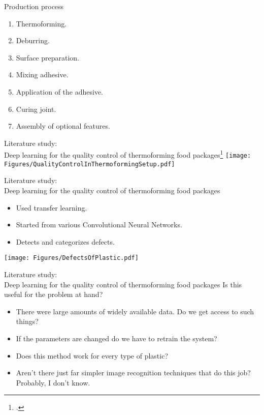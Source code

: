 \documentclass{beamer}
\begin{document}
	\begin{frame}{Production process}
		\begin{enumerate}
			\item Thermoforming.
			\item Deburring.
			\item Surface preparation.
			\item Mixing adhesive.
			\item Application of the adhesive.
			\item Curing joint.
			\item Assembly of optional features.
		\end{enumerate}
	\end{frame}
	
	\begin{frame}{Literature study:\\Deep learning for the quality control of thermoforming food packages\footcite{Banus2021}}
		\centering
		\texttt{[image: Figures/QualityControlInThermoformingSetup.pdf]}
	\end{frame}

	\begin{frame}{Literature study:\\Deep learning for the quality control of thermoforming food packages}
		\begin{itemize}
			\item Used transfer learning.
			\item Started from various Convolutional Neural Networks.
			\item Detects and categorizes defects.
		\end{itemize}
		\centering
		\texttt{[image: Figures/DefectsOfPlastic.pdf]}
	\end{frame}
	
	\begin{frame}{Literature study:\\Deep learning for the quality control of thermoforming food packages}
		Is this useful for the problem at hand?
		\pause
		\begin{itemize}
			\item There were large amounts of widely available data. Do we get access to such things?
			\pause
			\item If the parameters are changed do we have to retrain the system?
			\pause
			\item Does this method work for every type of plastic?
			\pause
			\item Aren't there just far simpler image recognition techniques that do this job? Probably, I don't know.
		\end{itemize}
	\end{frame}
\end{document}
